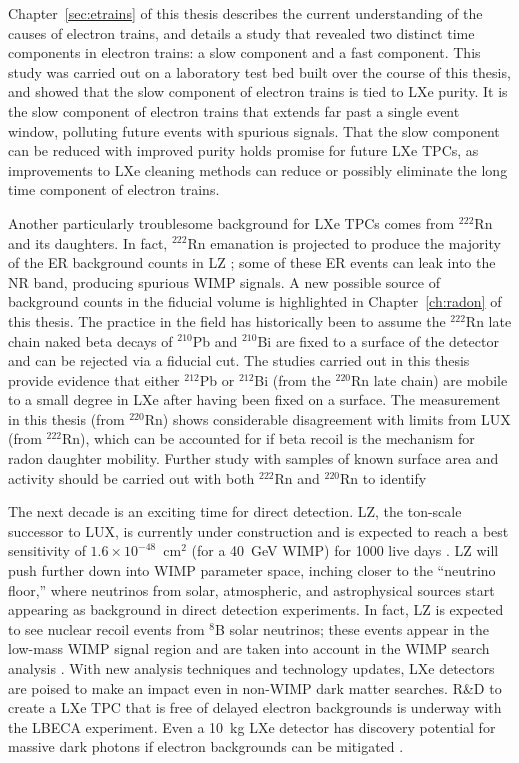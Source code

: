Chapter~\ref{sec:etrains} of this thesis describes the current understanding of the causes of electron trains, and details a study that revealed two distinct time components in electron trains: a slow component and a fast component. This study was carried out on a laboratory test bed built over the course of this thesis, and showed that the slow component of electron trains is tied to \ac{LXe} purity. It is the slow component of electron trains that extends far past a single event window, polluting future events with spurious signals. That the slow component can be reduced with improved purity holds promise for future \ac{LXe} \ac{TPC}s, as improvements to \ac{LXe} cleaning methods can reduce or possibly eliminate the long time component of electron trains.

Another particularly troublesome background for \ac{LXe} \ac{TPC}s comes from $^{222}$Rn and its daughters. In fact, $^{222}$Rn emanation is projected to produce the majority of the \ac{ER} background counts in \ac{LZ} \cite{LZ:Sensitivity}; some of these \ac{ER} events can leak into the \ac{NR} band, producing spurious \ac{WIMP} signals. A new possible source of background counts in the fiducial volume is highlighted in Chapter~\ref{ch:radon} of this thesis. The practice in the field has historically been to assume the $^{222}$Rn late chain naked beta decays of $^{210}$Pb and $^{210}$Bi are fixed to a surface of the detector and can be rejected via a fiducial cut. The studies carried out in this thesis provide evidence that either $^{212}$Pb or $^{212}$Bi (from the $^{220}$Rn late chain) are mobile to a small degree in \ac{LXe} after having been fixed on a surface. The measurement in this thesis (from $^{220}$Rn) shows considerable disagreement with limits from \ac{LUX} (from $^{222}$Rn), which can be accounted for if beta recoil is the mechanism for radon daughter mobility. Further study with samples of known surface area and activity should be carried out with both $^{222}$Rn and $^{220}$Rn to identify 

The next decade is an exciting time for direct detection. \ac{LZ}, the ton-scale successor to \ac{LUX}, is currently under construction and is expected to reach a best sensitivity of $1.6 \times 10^{-48}$~cm$^{2}$ (for a 40~GeV \ac{WIMP}) for 1000 live days \cite{LZ:Sensitivity}. \ac{LZ} will push further down into \ac{WIMP} parameter space, inching closer to the ``neutrino floor,'' where neutrinos from solar, atmospheric, and astrophysical sources start appearing as background in direct detection experiments. In fact, \ac{LZ} is expected to see nuclear recoil events from $^{8}$B solar neutrinos; these events appear in the low-mass \ac{WIMP} signal region and are taken into account in the \ac{WIMP} search analysis \cite{LZ:Sensitivity}. With new analysis techniques and technology updates, \ac{LXe} detectors are poised to make an impact even in non-\ac{WIMP} dark matter searches. R\&D to create a \ac{LXe} \ac{TPC} that is free of delayed electron backgrounds is underway with the \ac{LBECA} experiment. Even a 10~kg \ac{LXe} detector has discovery potential for massive dark photons if electron backgrounds can be mitigated \cite{cosmicvisions2017}. 

